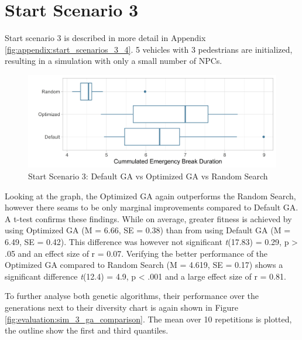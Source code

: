 \section{Start Scenario 3}
\label{sect:evaluation:scenario_3}
Start scenario 3 is described in more detail in Appendix \ref{fig:appendix:start_scenarios_3_4}. 5 vehicles with 3 pedestrians are initialized, resulting in a simulation with only a small number of NPCs.

\begin{figure}[ht] 
	\label{fig:evaluation:sim_3_comparison}
	\includegraphics[width=1\linewidth]{simulations/evaluation/plots/sim_3_comparison}
	\caption{Start Scenario 3: Default GA vs Optimized GA vs Random Search}
\end{figure}

Looking at the graph, the Optimized GA again outperforms the Random Search, however there seams to be only marginal improvements compared to Default GA.  A t-test confirms these findings. While on average, greater fitness is achieved by using Optimized GA (M = 6.66, SE = 0.38) than from using Default GA (M = 6.49, SE = 0.42). This difference was however not significant \textit{t}(17.83) = 0.29, p > .05 and an effect size of r = 0.07.
Verifying the better performance of the Optimized GA compared to Random Search (M = 4.619, SE = 0.17) shows a significant difference \textit{t}(12.4) = 4.9, p < .001 and a large effect size of r = 0.81.

To further analyse both genetic algorithms, their performance over the generations next to their diversity chart is again shown in Figure \ref{fig:evaluation:sim_3_ga_comparison}. The mean over 10 repetitions is plotted, the outline show the first and third quantiles.

